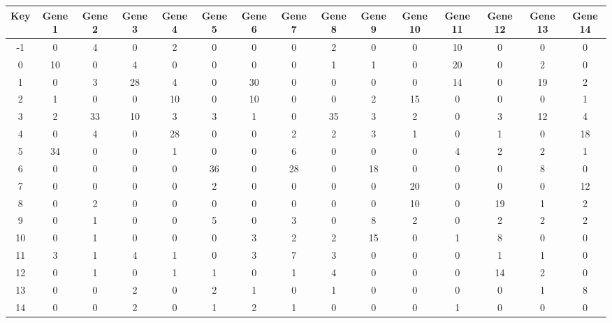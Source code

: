 \begin{tabular}{|c|c|c|c|c|c|c|c|c|c|c|c|c|c|c|}
\hline
Key & Gene 1 & Gene 2 & Gene 3 & Gene 4 & Gene 5 & Gene 6 & Gene 7 & Gene 8 & Gene 9 & Gene 10 & Gene 11 & Gene 12 & Gene 13 & Gene 14 \\
\hline
-1 & 0 & 4 & 0 & 2 & 0 & 0 & 0 & 2 & 0 & 0 & 10 & 0 & 0 & 0 \\
0 & 10 & 0 & 4 & 0 & 0 & 0 & 0 & 1 & 1 & 0 & 20 & 0 & 2 & 0 \\
1 & 0 & 3 & 28 & 4 & 0 & 30 & 0 & 0 & 0 & 0 & 14 & 0 & 19 & 2 \\
2 & 1 & 0 & 0 & 10 & 0 & 10 & 0 & 0 & 2 & 15 & 0 & 0 & 0 & 1 \\
3 & 2 & 33 & 10 & 3 & 3 & 1 & 0 & 35 & 3 & 2 & 0 & 3 & 12 & 4 \\
4 & 0 & 4 & 0 & 28 & 0 & 0 & 2 & 2 & 3 & 1 & 0 & 1 & 0 & 18 \\
5 & 34 & 0 & 0 & 1 & 0 & 0 & 6 & 0 & 0 & 0 & 4 & 2 & 2 & 1 \\
6 & 0 & 0 & 0 & 0 & 36 & 0 & 28 & 0 & 18 & 0 & 0 & 0 & 8 & 0 \\
7 & 0 & 0 & 0 & 0 & 2 & 0 & 0 & 0 & 0 & 20 & 0 & 0 & 0 & 12 \\
8 & 0 & 2 & 0 & 0 & 0 & 0 & 0 & 0 & 0 & 10 & 0 & 19 & 1 & 2 \\
9 & 0 & 1 & 0 & 0 & 5 & 0 & 3 & 0 & 8 & 2 & 0 & 2 & 2 & 2 \\
10 & 0 & 1 & 0 & 0 & 0 & 3 & 2 & 2 & 15 & 0 & 1 & 8 & 0 & 0 \\
11 & 3 & 1 & 4 & 1 & 0 & 3 & 7 & 3 & 0 & 0 & 0 & 1 & 1 & 0 \\
12 & 0 & 1 & 0 & 1 & 1 & 0 & 1 & 4 & 0 & 0 & 0 & 14 & 2 & 0 \\
13 & 0 & 0 & 2 & 0 & 2 & 1 & 0 & 1 & 0 & 0 & 0 & 0 & 1 & 8 \\
14 & 0 & 0 & 2 & 0 & 1 & 2 & 1 & 0 & 0 & 0 & 1 & 0 & 0 & 0 \\
\hline
\end{tabular}
